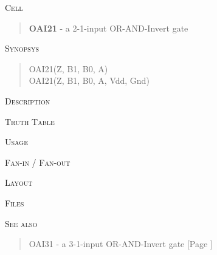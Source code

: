 
\label{OAI21}
\textsc{Cell}
\begin{quote}
    \textbf{OAI21} - a 2-1-input OR-AND-Invert gate
\end{quote}

\textsc{Synopsys}
\begin{quote}
    OAI21(Z, B1, B0, A) \\
    OAI21(Z, B1, B0, A, Vdd, Gnd)
\end{quote}

\textsc{Description}

%

\textsc{Truth Table}


\textsc{Usage}

\textsc{Fan-in / Fan-out}

\textsc{Layout}

\textsc{Files}

\textsc{See also}
\begin{quote}
    OAI31 - a 3-1-input OR-AND-Invert gate [Page \pageref{OAI31}]
\end{quote}
